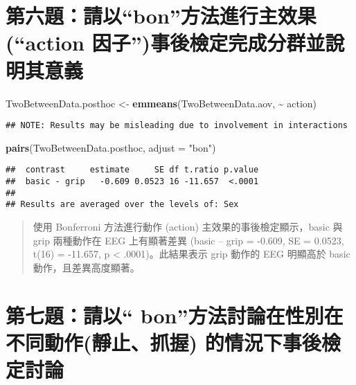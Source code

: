 \documentclass[
  12pt,
]{article}
\newenvironment{Shaded}{\begin{snugshade}}{\end{snugshade}}
\newcommand{\AttributeTok}[1]{\textcolor[rgb]{0.13,0.29,0.53}{#1}}
\newcommand{\FunctionTok}[1]{\textcolor[rgb]{0.13,0.29,0.53}{\textbf{#1}}}
\newcommand{\NormalTok}[1]{#1}
\newcommand{\OtherTok}[1]{\textcolor[rgb]{0.56,0.35,0.01}{#1}}
\newcommand{\SpecialCharTok}[1]{\textcolor[rgb]{0.81,0.36,0.00}{\textbf{#1}}}
\newcommand{\StringTok}[1]{\textcolor[rgb]{0.31,0.60,0.02}{#1}}
\begin{document}
\section{第六題：請以``bon''方法進行主效果(``action
因子'')事後檢定完成分群並說明其意義}\label{ux7b2cux516dux984cux8acbux4ee5bonux65b9ux6cd5ux9032ux884cux4e3bux6548ux679caction-ux56e0ux5b50ux4e8bux5f8cux6aa2ux5b9aux5b8cux6210ux5206ux7fa4ux4e26ux8aaaux660eux5176ux610fux7fa9}

\begin{Shaded}
\begin{Highlighting}[]
\NormalTok{TwoBetweenData.posthoc }\OtherTok{\textless{}{-}} \FunctionTok{emmeans}\NormalTok{(TwoBetweenData.aov, }\SpecialCharTok{\textasciitilde{}}\NormalTok{ action)}
\end{Highlighting}
\end{Shaded}

\begin{verbatim}
## NOTE: Results may be misleading due to involvement in interactions
\end{verbatim}

\begin{Shaded}
\begin{Highlighting}[]
\FunctionTok{pairs}\NormalTok{(TwoBetweenData.posthoc, }\AttributeTok{adjust =} \StringTok{"bon"}\NormalTok{)}
\end{Highlighting}
\end{Shaded}

\begin{verbatim}
##  contrast     estimate     SE df t.ratio p.value
##  basic - grip   -0.609 0.0523 16 -11.657  <.0001
## 
## Results are averaged over the levels of: Sex
\end{verbatim}

\begin{quote}
使用 Bonferroni 方法進行動作 (action) 主效果的事後檢定顯示，basic 與
grip 兩種動作在 EEG 上有顯著差異 (basic -- grip = -0.609, SE = 0.0523,
t(16) = -11.657, p \textless{} .0001)。此結果表示 grip 動作的 EEG
明顯高於 basic 動作，且差異高度顯著。
\end{quote}

\section{第七題：請以`` bon''方法討論在性別在不同動作(靜止、抓握)
的情況下事後檢定討論}\label{ux7b2cux4e03ux984cux8acbux4ee5-bonux65b9ux6cd5ux8a0eux8ad6ux5728ux6027ux5225ux5728ux4e0dux540cux52d5ux4f5cux975cux6b62ux6293ux63e1-ux7684ux60c5ux6cc1ux4e0bux4e8bux5f8cux6aa2ux5b9aux8a0eux8ad6}
\end{document}
